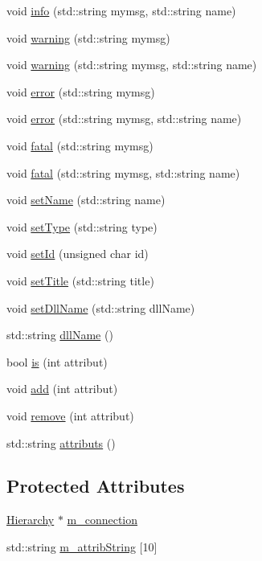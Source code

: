 \begin{DoxyCompactItemize}
void \hyperlink{classObject_a1ca123253dfd30fc28b156f521dcbdae}{info} (std::string mymsg, std::string name)
\item 
void \hyperlink{classObject_a65cd4fda577711660821fd2cd5a3b4c9}{warning} (std::string mymsg)
\item 
void \hyperlink{classObject_a11f101db4dd73d9391b0231818881d86}{warning} (std::string mymsg, std::string name)
\item 
void \hyperlink{classObject_a204a95f57818c0f811933917a30eff45}{error} (std::string mymsg)
\item 
void \hyperlink{classObject_ad7f6c457733082efa2f9ff5f5c8e119a}{error} (std::string mymsg, std::string name)
\item 
void \hyperlink{classObject_aad5a16aac7516ce65bd5ec02ab07fc80}{fatal} (std::string mymsg)
\item 
void \hyperlink{classObject_ae62acd3d09f716220f75f252dc38bc9a}{fatal} (std::string mymsg, std::string name)
\item 
void \hyperlink{classObject_ae30fea75683c2d149b6b6d17c09ecd0c}{setName} (std::string name)
\item 
void \hyperlink{classObject_aae534cc9d982bcb9b99fd505f2e103a5}{setType} (std::string type)
\item 
void \hyperlink{classObject_a398fe08cba594a0ce6891d59fe4f159f}{setId} (unsigned char id)
\item 
void \hyperlink{classObject_a89557dbbad5bcaa02652f5d7fa35d20f}{setTitle} (std::string title)
\item 
void \hyperlink{classObject_a870c5af919958c2136623b2d7816d123}{setDllName} (std::string dllName)
\item 
std::string \hyperlink{classObject_a2e3947f2870094c332d7454117f3ec63}{dllName} ()
\item 
bool \hyperlink{classAttrib_a704f26af560909ad22065083bb7d4c34}{is} (int attribut)
\item 
void \hyperlink{classAttrib_a235f773af19c900264a190b00a3b4ad7}{add} (int attribut)
\item 
void \hyperlink{classAttrib_a7d4ef7e32d93cb287792b87b857e79f3}{remove} (int attribut)
\item 
std::string \hyperlink{classAttrib_aee7bbf16b144887f196e1341b24f8a26}{attributs} ()
\end{DoxyCompactItemize}
\subsection*{Protected Attributes}
\begin{DoxyCompactItemize}
\item 
\hyperlink{classHierarchy}{Hierarchy} $\ast$ \hyperlink{classElement_abe3de7a5dbbc9a6dd2d7e012e5fdb266}{m\_\-connection}
\item 
std::string \hyperlink{classAttrib_a3414521d7a82476e874b25a5407b5e63}{m\_\-attribString} \mbox{[}10\mbox{]}
\end{DoxyCompactItemize}
